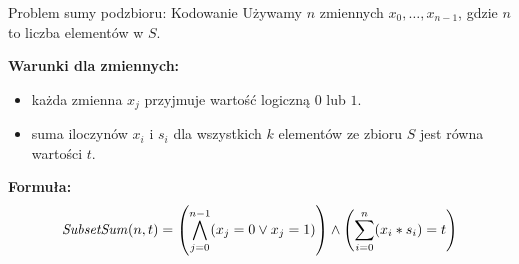 \begin{frame}{Problem sumy podzbioru: Kodowanie}
Używamy $n$ zmiennych $x_0,…, x_{n−1}$, gdzie $n$ to liczba elementów w $S$.
\vspace{10pt}

\textbf{Warunki dla zmiennych:}
\vspace{5pt}
\begin{itemize}
	\item każda zmienna $x_j$ przyjmuje wartość logiczną $0$ lub $1$.
	\item suma iloczynów $x_i$ i $s_i$ dla wszystkich $k$ elementów ze zbioru $S$ jest równa wartości $t$.
\end{itemize}
\vspace{10pt}

\textbf{Formuła:}
\begin{align*}
	{\mathit{SubsetSum}}(n, t) = \left( \bigwedge_{j=0}^{n-1} (x_j = 0 \lor x_j = 1) \right) \land 
	\left( \sum_{i=0}^{n} (x_i * s_i) = t \right)
\end{align*}
\end{frame}
	